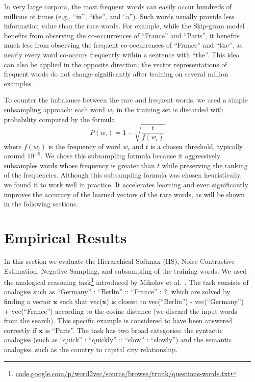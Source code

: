 \documentclass{article}
\begin{document}
In very large corpora, the most frequent words can easily occur hundreds of millions
of times (e.g., ``in'', ``the'', and ``a''). Such words usually
provide less information value than the rare words. For example, while the
Skip-gram model benefits from observing the co-occurrences of ``France'' and
``Paris'', it benefits much less from observing the frequent co-occurrences of ``France''
and ``the'', as nearly every word co-occurs frequently within a sentence
with ``the''. This idea can also be applied in the opposite
direction; the vector representations of frequent words do not change
significantly after training on several million examples.

To counter the imbalance between the rare and frequent words, we used a
simple subsampling approach: each word $w_i$ in the training set is
discarded with probability computed by the formula
\begin{equation}
P(w_i) = 1-\sqrt{\frac{t}{f(w_i)}}
\end{equation}
where $f(w_i)$ is the frequency of word $w_i$ and $t$ is a chosen
threshold, typically around $10^{-5}$.  We chose this subsampling
formula because it aggressively subsamples words whose frequency is
greater than $t$ while preserving the ranking of the frequencies.
Although this subsampling formula was chosen heuristically, we found
it to work well in practice. It accelerates learning and even significantly improves
the accuracy of the learned vectors of the rare words, as will be shown in the following sections.

\section{Empirical Results}

In this section we evaluate the Hierarchical Softmax (HS), Noise Contrastive Estimation,
Negative Sampling, and subsampling of the training words. We used
the analogical reasoning task\footnote{\url{code.google.com/p/word2vec/source/browse/trunk/questions-words.txt}}
introduced by Mikolov et al.~\cite{mikolov}.
The task consists of analogies such as ``Germany'' : ``Berlin'' :: ``France'' : ?,
which are solved by finding a vector $\mathbf{x}$
such that vec($\mathbf{x}$) is closest to
vec(``Berlin'') - vec(``Germany'') + vec(``France'') according to the
cosine distance (we discard the input words from the search).
This specific example is considered to have been
answered correctly if $\mathbf{x}$ is ``Paris''.  The task has
two broad categories: the syntactic analogies (such as
``quick'' : ``quickly'' :: ``slow'' : ``slowly'') and the semantic analogies, such
as the country to capital city relationship.
\end{document}
